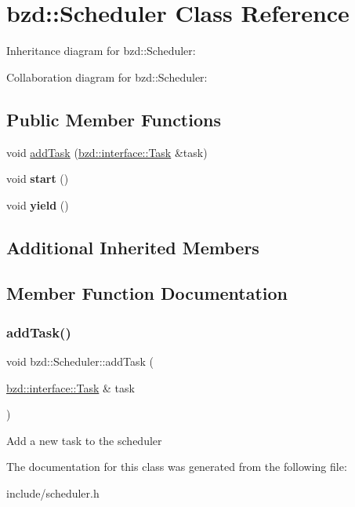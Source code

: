 \hypertarget{classbzd_1_1Scheduler}{}\section{bzd\+:\+:Scheduler Class Reference}
\label{classbzd_1_1Scheduler}


Inheritance diagram for bzd\+:\+:Scheduler\+:


Collaboration diagram for bzd\+:\+:Scheduler\+:
\subsection*{Public Member Functions}
\begin{DoxyCompactItemize}
\item 
void \hyperlink{classbzd_1_1Scheduler_a976e50ed0d9504b9d83a238a0be894ff}{add\+Task} (\hyperlink{classbzd_1_1interface_1_1Task}{bzd\+::interface\+::\+Task} \&task)
\item 
\mbox{\label{classbzd_1_1Scheduler_a91c204d863b2ffc4bfe1d4ac92b621a5}} 
void {\bfseries start} ()
\item 
\mbox{\label{classbzd_1_1Scheduler_a2b41b666d28680da4e944816747a82d6}} 
void {\bfseries yield} ()
\end{DoxyCompactItemize}
\subsection*{Additional Inherited Members}


\subsection{Member Function Documentation}
\mbox{\label{classbzd_1_1Scheduler_a976e50ed0d9504b9d83a238a0be894ff}} 
\subsubsection{\texorpdfstring{add\+Task()}{addTask()}}
{\footnotesize\ttfamily void bzd\+::\+Scheduler\+::add\+Task (\begin{DoxyParamCaption}\item[{\hyperlink{classbzd_1_1interface_1_1Task}{bzd\+::interface\+::\+Task} \&}]{task }\end{DoxyParamCaption})\hspace{0.3cm}{\ttfamily [inline]}}

Add a new task to the scheduler 

The documentation for this class was generated from the following file\+:\begin{DoxyCompactItemize}
\item 
include/scheduler.\+h\end{DoxyCompactItemize}
